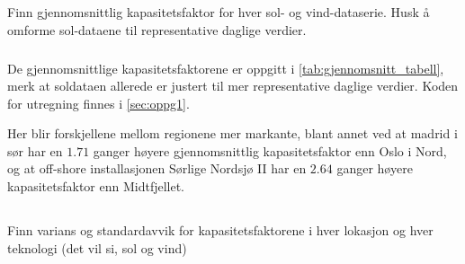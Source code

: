 \documentclass{article}
\begin{document}
\newpage
\subsection{}
Finn gjennomsnittlig kapasitetsfaktor for hver sol- og vind-dataserie. Husk å omforme sol-dataene til representative daglige verdier.

\subsubsection{}
De gjennomsnittlige kapasitetsfaktorene er oppgitt i \autoref{tab:gjennomsnitt_tabell}, merk at soldataen allerede er justert til mer representative daglige verdier.
Koden for utregning finnes i \autoref{sec:oppg1}.

\begin{table}[h]
\centering
{}
\qquad
{}
\caption{Gjennomsnittlige kapasitetsfaktorer per lokasjon og teknologi.}
\label{tab:gjennomsnitt_tabell}
\end{table}

Her blir forskjellene mellom regionene mer markante, blant annet ved at madrid i sør har en $1.71$ ganger høyere gjennomsnittlig kapasitetsfaktor enn Oslo i Nord, og at off-shore installasjonen Sørlige Nordsjø II har en $2.64$ ganger høyere kapasitetsfaktor enn Midtfjellet.

\subsection{}
Finn varians og standardavvik for kapasitetsfaktorene i hver lokasjon og hver teknologi (det vil si, sol og vind)
\end{document}
